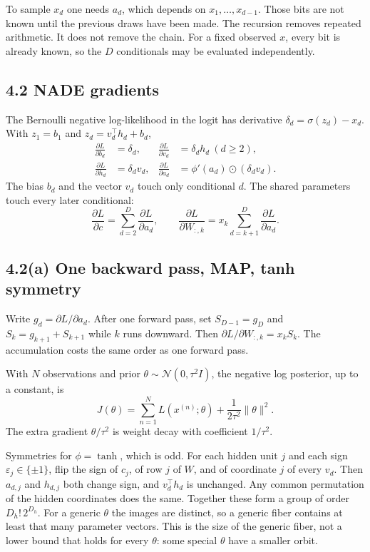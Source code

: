 \documentclass[11pt]{article}
\theoremstyle{remark}
\newcommand{\N}{\mathcal{N}}
\begin{document}
To sample \(x_d\) one needs \(a_d\), which depends on \(x_1,\ldots,x_{d-1}\). Those bits are not known until the previous draws have been made. The recursion removes repeated arithmetic. It does not remove the chain. For a fixed observed \(x\), every bit is already known, so the \(D\) conditionals may be evaluated independently.

\subsection*{4.2 NADE gradients}

The Bernoulli negative log-likelihood in the logit has derivative \(\delta_d=\sigma(z_d)-x_d\). With \(z_1=b_1\) and \(z_d=v_d^\top h_d+b_d\),
\begin{align*}
\frac{\partial L}{\partial b_d}&=\delta_d, &
\frac{\partial L}{\partial v_d}&=\delta_d h_d\ (d\ge 2),\\
\frac{\partial L}{\partial h_d}&=\delta_d v_d, &
\frac{\partial L}{\partial a_d}&=\phi'(a_d)\odot(\delta_d v_d).
\end{align*}
The bias \(b_d\) and the vector \(v_d\) touch only conditional \(d\). The shared parameters touch every later conditional:
\[
\frac{\partial L}{\partial c}=\sum_{d=2}^D\frac{\partial L}{\partial a_d},\qquad
\frac{\partial L}{\partial W_{:,k}}=x_k\sum_{d=k+1}^D\frac{\partial L}{\partial a_d}.
\]

\subsection*{4.2(a) One backward pass, MAP, tanh symmetry}

Write \(g_d=\partial L/\partial a_d\). After one forward pass, set \(S_{D-1}=g_D\) and \(S_k=g_{k+1}+S_{k+1}\) while \(k\) runs downward. Then \(\partial L/\partial W_{:,k}=x_k S_k\). The accumulation costs the same order as one forward pass.

With \(N\) observations and prior \(\theta\sim\N(0,\tau^2 I)\), the negative log posterior, up to a constant, is
\[
J(\theta)=\sum_{n=1}^N L(x^{(n)};\theta)+\frac{1}{2\tau^2}\lVert\theta\rVert^2.
\]
The extra gradient \(\theta/\tau^2\) is weight decay with coefficient \(1/\tau^2\).

Symmetries for \(\phi=\tanh\), which is odd. For each hidden unit \(j\) and each sign \(\varepsilon_j\in\{\pm 1\}\), flip the sign of \(c_j\), of row \(j\) of \(W\), and of coordinate \(j\) of every \(v_d\). Then \(a_{d,j}\) and \(h_{d,j}\) both change sign, and \(v_d^\top h_d\) is unchanged. Any common permutation of the hidden coordinates does the same. Together these form a group of order \(D_h!\,2^{D_h}\). For a generic \(\theta\) the images are distinct, so a generic fiber contains at least that many parameter vectors. This is the size of the generic fiber, not a lower bound that holds for every \(\theta\): some special \(\theta\) have a smaller orbit.
\end{document}
